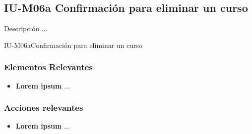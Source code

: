 
\subsection{IU-M06a Confirmación para eliminar un curso}

 Descripción ...

        {IU-M06a}{Confirmación para eliminar un curso}

\subsubsection{Elementos Relevantes}

    \begin{itemize}
    \item {\bf Lorem ipsum}
        ...
    \end{itemize}

\subsubsection{Acciones relevantes}

    \begin{itemize}
    \item {\bf Lorem ipsum}
        ...
    \end{itemize}

\clearpage
